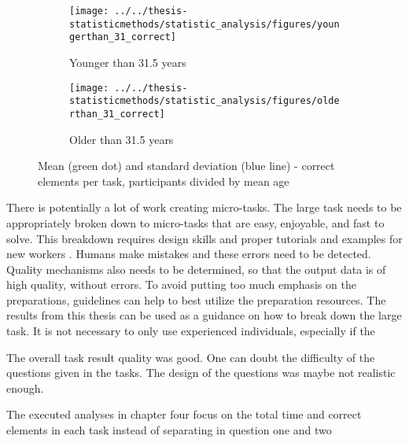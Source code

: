 \begin{figure}[H]
	\centering
	\begin{subfigure}[b]{0.4\textwidth}
		\centering
		\texttt{[image: ../../thesis-statisticmethods/statistic\_analysis/figures/youngerthan\_31\_correct]}
		\caption{Younger than 31.5 years}
		\label{fig:youngerthan31correct}
	\end{subfigure}
	\begin{subfigure}[b]{0.4\textwidth}
		\centering
		\texttt{[image: ../../thesis-statisticmethods/statistic\_analysis/figures/olderthan\_31\_correct]}
		\caption{Older than 31.5 years}
		\label{fig:olderthan31correct}
	\end{subfigure}
	\caption{Mean (green dot) and standard deviation (blue line) - correct elements per task, participants divided by mean age}
	\label{fig:splittedbymeanage}
\end{figure}



There is potentially a lot of work creating micro-tasks. The large task needs to be appropriately broken down to micro-tasks that are easy, enjoyable, and fast to solve. This breakdown requires design skills and proper tutorials and examples for new workers \citep{Schulze2012}. Humans make mistakes and these errors need to be detected. Quality mechanisms also needs to be determined, so that the output data is of high quality, without errors. To avoid putting too much emphasis on the preparations, guidelines can help to best utilize the preparation resources. The results from this thesis can be used as a guidance on how to break down the large task. It is not necessary to only use experienced individuals, especially if the 

The overall task result quality was good. One can doubt the difficulty of the questions given in the tasks. The design of the questions was maybe not realistic enough. 

The executed analyses in chapter four focus on the total time and correct elements in each task instead of separating in question one and two 